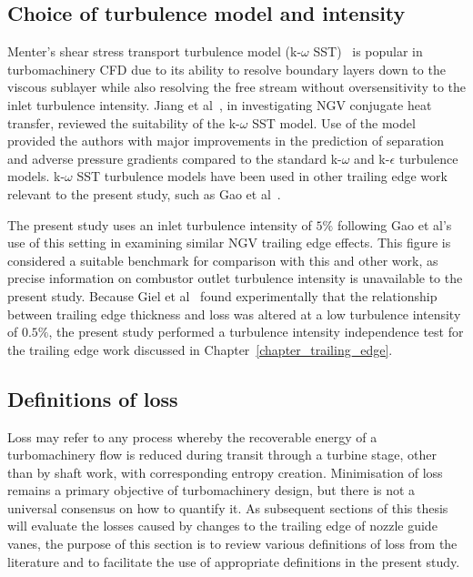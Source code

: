 \documentclass[a4paper, 11pt, oneside]{report}
\begin{document}
\subsection{Choice of turbulence model and intensity}

Menter's shear stress transport turbulence model (k-$\omega$ SST)~\cite{menter_turbulence_models} is popular in turbomachinery CFD due to its ability to resolve boundary layers down to the viscous sublayer while also resolving the free stream without oversensitivity to the inlet turbulence intensity. Jiang et al~\cite{jiang_heat_transfer}, in investigating NGV conjugate heat transfer, reviewed the suitability of the k-$\omega$ SST model. Use of the model provided the authors with major improvements in the prediction of separation and adverse pressure gradients compared to the standard k-$\omega$ and k-$\epsilon$ turbulence models. k-$\omega$ SST turbulence models have been used in other trailing edge work relevant to the present study, such as Gao et al~\cite{gao_te}. 

The present study uses an inlet turbulence intensity of $5\%$ following Gao et al's~\cite{gao_te} use of this setting in examining similar NGV trailing edge effects. This figure is considered a suitable benchmark for comparison with this and other work, as precise information on combustor outlet turbulence intensity is unavailable to the present study. Because Giel et al~\cite{giel_te_thickness} found experimentally that the relationship between trailing edge thickness and loss was altered at a low turbulence intensity of $0.5\%$, the present study performed a turbulence intensity independence test for the trailing edge work discussed in Chapter~\ref{chapter_trailing_edge}.

\subsection{Definitions of loss}

Loss may refer to any process whereby the recoverable energy of a turbomachinery flow is reduced during transit through a turbine stage, other than by shaft work, with corresponding entropy creation. Minimisation of loss remains a primary objective of turbomachinery design, but there is not a universal consensus on how to quantify it. As subsequent sections of this thesis will evaluate the losses caused by changes to the trailing edge of nozzle guide vanes, the purpose of this section is to review various definitions of loss from the literature and to facilitate the use of appropriate definitions in the present study.
\end{document}
